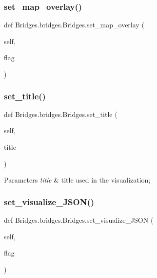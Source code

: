 \subsubsection{\texorpdfstring{set\+\_\+map\+\_\+overlay()}{set\_map\_overlay()}}
{\footnotesize\ttfamily def Bridges.\+bridges.\+Bridges.\+set\+\_\+map\+\_\+overlay (\begin{DoxyParamCaption}\item[{}]{self,  }\item[{}]{flag }\end{DoxyParamCaption})}

\mbox{\label{class_bridges_1_1bridges_1_1_bridges_a1732ccf3904c3de48f697feff32b95a5}} 
\subsubsection{\texorpdfstring{set\+\_\+title()}{set\_title()}}
{\footnotesize\ttfamily def Bridges.\+bridges.\+Bridges.\+set\+\_\+title (\begin{DoxyParamCaption}\item[{}]{self,  }\item[{}]{title }\end{DoxyParamCaption})}


\begin{DoxyParams}{Parameters}
{\em title} & title used in the visualization; \\
\hline
\end{DoxyParams}
\mbox{\label{class_bridges_1_1bridges_1_1_bridges_a945f547bc7feb7e129811f8874a3af6b}} 
\subsubsection{\texorpdfstring{set\+\_\+visualize\+\_\+\+J\+S\+O\+N()}{set\_visualize\_JSON()}}
{\footnotesize\ttfamily def Bridges.\+bridges.\+Bridges.\+set\+\_\+visualize\+\_\+\+J\+S\+ON (\begin{DoxyParamCaption}\item[{}]{self,  }\item[{}]{flag }\end{DoxyParamCaption})}

